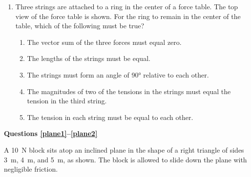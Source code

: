 \documentclass{../../../oss-apphys}
\begin{document}
\begin{multicols}{2}
\begin{enumerate}[resume,leftmargin=18pt]
  \item Three strings are attached to a ring in the center of a force table. The
    top view of the force table is shown. For the ring to remain in the
    center of the table, which of the following must be true?
    \begin{center}
    \end{center}
    \begin{enumerate}[nosep,leftmargin=18pt,label=(\Alph*)]
    \item The vector sum of the three forces must equal zero.
    \item The lengths of the strings must be equal.
    \item The strings must form an angle of \ang{90} relative to each other.
    \item The magnitudes of two of the tensions in the strings must equal the
      tension in the third string.
    \item The tension in each string must be equal to each other.
    \end{enumerate}  
  \end{enumerate}
  \columnbreak
  
  \textbf{Questions \ref{plane1}--\ref{plane2}}

  A \SI{10}{\newton} block sits atop an inclined plane in the shape of a
  right triangle of sides \SI{3}{\metre}, \SI{4}{\metre}, and \SI{5}{\metre},
  as shown. The block is allowed to slide down the plane with negligible
  friction.
  \begin{center}
  \end{center}
  

\end{multicols}
\end{document}
